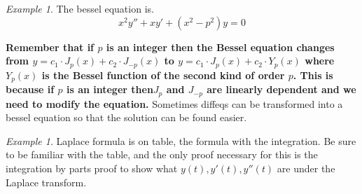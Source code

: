 \documentclass[10pt]{article}
\theoremstyle{definition}
\theoremstyle{remark}
\newtheorem{Ex}[Thm]{Example}
\theoremstyle{definition}
\begin{document}
\begin{Ex}
The bessel equation is. 
$$
x^2y''+xy'+(x^2-p^2)y=0
$$

\textbf{Remember that if $p$ is an integer then the Bessel equation changes from $y=c_1\cdot J_p(x)+c_2\cdot J_{-p}(x)$ to $y=c_1\cdot J_p(x)+c_2\cdot Y_p(x)$ where $Y_p(x)$ is the Bessel function of the second kind of order $p$. This is because if $p$ is an integer then$J_p$ and $J_{-p}$ are linearly dependent and we need to modify the equation.} Sometimes diffeqs can be transformed into a bessel equation so that the solution can be found easier. 
\end{Ex}

\begin{Ex}
Laplace formula is on table, the formula with the integration. Be sure to be familiar with the table, and the only proof necessary for this is the integration by parts proof to show what $y(t),y'(t),y''(t)$ are under the Laplace transform. 
\end{Ex}
\end{document}
